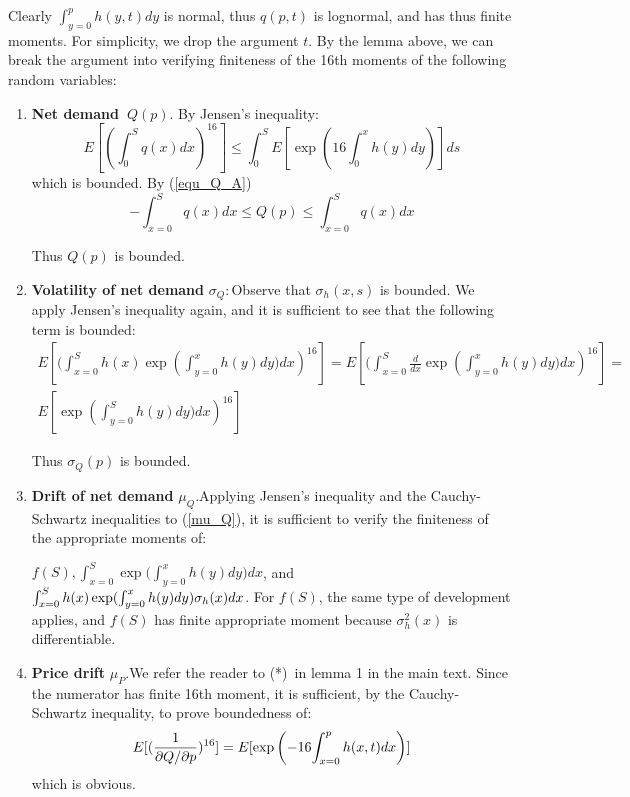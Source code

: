 \documentclass{article}
\begin{document}
Clearly ${\int_{y=0}^{p}h(y,t)dy}$ is normal, thus $q(p,t)$ is lognormal,
and has thus finite moments. For simplicity, we drop the argument $t$. By
the lemma above, we can break the argument into verifying finiteness of the
16th moments of the following random variables:

\bigskip

\begin{enumerate}
\item \textbf{Net demand\ }$Q(p).$ By Jensen's inequality:%
\begin{equation*}
E[(\int_{0}^{S}q(x)dx)^{16}]\leq \int_{0}^{S}E[\exp (16\int_{0}^{x}h(y)dy)]ds
\end{equation*}%
which is bounded. By (\ref{equ_Q_A}) 
\begin{equation*}
-\int_{x=0}^{S}q(x)dx\leq Q(p)\leq \int_{x=0}^{S}q(x)dx
\end{equation*}

Thus $Q(p)$ is bounded.

\item \textbf{Volatility of net demand }$\sigma _{Q}:$Observe that $\sigma
_{h}(x,s)$ is bounded. We apply Jensen's inequality again, and it is
sufficient to see that the following term is bounded:%
\begin{gather*}
E[(\int_{x=0}^{S}{h(x)}\exp ({\int_{y=0}^{x}h(y)dy)}dx)^{16}]=E[(%
\int_{x=0}^{S}\frac{d}{dx}\exp ({\int_{y=0}^{x}h(y)dy)}dx)^{16}]= \\
E[\exp ({\int_{y=0}^{S}h(y)dy)}dx)^{16}]
\end{gather*}

Thus $\sigma _{Q}(p)$ is bounded.

\item \textbf{Drift of net demand }$\mu _{Q}.$Applying Jensen's inequality
and the Cauchy-Schwartz inequalities to (\ref{mu_Q}), it is sufficient to
verify the finiteness of the appropriate moments of:

$f(S),\int_{x=0}^{S}\exp ({\int_{y=0}^{x}h(y)dy)dx}$, and $\int_{x=0}^{S}{%
h(x)}\exp ({\int_{y=0}^{x}h(y)dy)\sigma _{h}(x)dx}$. For $f(S)$, the same
type of development applies, and $f(S)$ has finite appropriate moment
because $\sigma _{h}^{2}(x)$ is differentiable.

\item \textbf{Price drift }$\mu _{P}.$We refer the reader to (*)\ in lemma 1
in the main text. Since the numerator has finite 16th moment, it is
sufficient, by the Cauchy-Schwartz inequality, to prove boundedness of:%
\begin{equation*}
E[(\frac{1}{\partial Q/\partial p})^{16}]=E[\exp \left( -16{%
\int_{x=0}^{p}h(x,t)dx}\right) ]
\end{equation*}%
\qquad which is obvious.


\end{enumerate}
\end{document}
